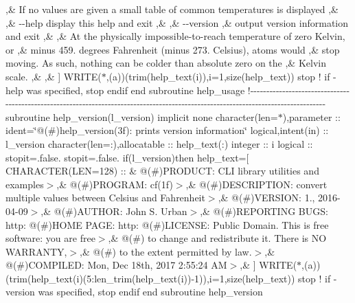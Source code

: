 \textquotesingle{},\& \textquotesingle{} If no values are given a small table of common temperatures is displayed \textquotesingle{},\& \textquotesingle{} \textquotesingle{},\& \textquotesingle{} -\/-\/help display this help and exit \textquotesingle{},\& \textquotesingle{} \textquotesingle{},\& \textquotesingle{} -\/-\/version \textquotesingle{},\& \textquotesingle{} output version information and exit \textquotesingle{},\& \textquotesingle{} \textquotesingle{},\& \textquotesingle{} At the physically impossible-\/to-\/reach temperature of zero Kelvin, or \textquotesingle{},\& \textquotesingle{} minus 459. degrees Fahrenheit (minus 273. Celsius), atoms would \textquotesingle{},\& \textquotesingle{} stop moving. As such, nothing can be colder than absolute zero on the \textquotesingle{},\& \textquotesingle{} Kelvin scale. \textquotesingle{},\& \textquotesingle{} \textquotesingle{},\& \textquotesingle{}\textquotesingle{}\mbox{]} W\+R\+I\+T\+E($\ast$,\textquotesingle{}(a)\textquotesingle{})(trim(help\+\_\+text(i)),i=1,size(help\+\_\+text)) stop ! if -\/help was specified, stop endif end subroutine help\+\_\+usage !-\/-\/-\/-\/-\/-\/-\/-\/-\/-\/-\/-\/-\/-\/-\/-\/-\/-\/-\/-\/-\/-\/-\/-\/-\/-\/-\/-\/-\/-\/-\/-\/-\/-\/-\/-\/-\/-\/-\/-\/-\/-\/-\/-\/-\/-\/-\/-\/-\/-\/-\/-\/-\/-\/-\/-\/-\/-\/-\/-\/-\/-\/-\/-\/-\/-\/-\/-\/-\/-\/-\/-\/-\/-\/-\/-\/-\/-\/-\/-\/-\/-\/-\/-\/-\/-\/-\/-\/-\/-\/-\/-\/-\/-\/-\/-\/-\/-\/-\/-\/-\/-\/-\/-\/-\/-\/-\/-\/-\/-\/-\/-\/-\/-\/-\/-\/-\/-\/-\/-\/-\/-\/-\/-\/-\/-\/-\/-\/-\/-\/-\/ subroutine help\+\_\+version(l\+\_\+version) implicit none character(len=$\ast$),parameter \+:: ident=\char`\"{}@(\#)help\+\_\+version(3f)\+: prints version information\char`\"{} logical,intent(in) \+:: l\+\_\+version character(len=\+:),allocatable \+:: help\+\_\+text(\+:) integer \+:: i logical \+:: stopit=.\+false. stopit=.\+false. if(l\+\_\+version)then help\+\_\+text=\mbox{[} C\+H\+A\+R\+A\+C\+T\+E\+R(\+L\+E\+N=128) \+:: \& \textquotesingle{}@(\#)\+P\+R\+O\+D\+U\+C\+T\+: C\+L\+I library utilities and examples$>$\textquotesingle{},\& \textquotesingle{}@(\#)\+P\+R\+O\+G\+R\+A\+M\+: cf(1f)$>$\textquotesingle{},\& \textquotesingle{}@(\#)\+D\+E\+S\+C\+R\+I\+P\+T\+I\+O\+N\+: convert multiple values between Celsius and Fahrenheit$>$\textquotesingle{},\& \textquotesingle{}@(\#)\+V\+E\+R\+S\+I\+O\+N\+: 1., 2016-\/04-\/09$>$\textquotesingle{},\& \textquotesingle{}@(\#)\+A\+U\+T\+H\+O\+R\+: John S. Urban$>$\textquotesingle{},\& \textquotesingle{}@(\#)\+R\+E\+P\+O\+R\+T\+I\+N\+G B\+U\+G\+S\+: http\+: \textquotesingle{}@(\#)\+H\+O\+M\+E P\+A\+G\+E\+: http\+: \textquotesingle{}@(\#)\+L\+I\+C\+E\+N\+S\+E\+: Public Domain. This is free software\+: you are free$>$\textquotesingle{},\& \textquotesingle{}@(\#) to change and redistribute it. There is N\+O W\+A\+R\+R\+A\+N\+T\+Y,$>$\textquotesingle{},\& \textquotesingle{}@(\#) to the extent permitted by law.$>$\textquotesingle{},\& \textquotesingle{}@(\#)\+C\+O\+M\+P\+I\+L\+E\+D\+: Mon, Dec 18th, 2017 2\+:55\+:24 A\+M$>$\textquotesingle{},\& \textquotesingle{}\textquotesingle{}\mbox{]} W\+R\+I\+T\+E($\ast$,\textquotesingle{}(a)\textquotesingle{})(trim(help\+\_\+text(i)(5\+:len\+\_\+trim(help\+\_\+text(i))-\/1)),i=1,size(help\+\_\+text)) stop ! if -\/version was specified, stop endif end subroutine help\+\_\+version 